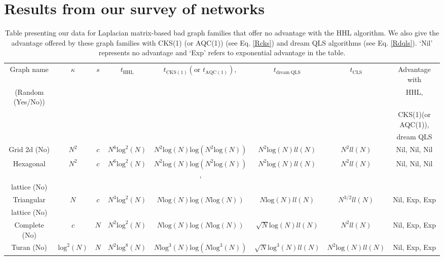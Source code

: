 \documentclass[%
 reprint,
 superscriptaddress,
 amsmath,amssymb,
 aps,
 pra,
floatfix,
nofootinbib,
]{revtex4-2}
\theoremstyle{definition}
\theoremstyle{remark}
\begin{document}
\section{Results from our survey of networks} \label{sec:survey} 

\newcommand{\columnn}[8]{#1 &#2 &#3 &#4 &#6  &#8 &#5 &#7  \\ }
\begin{table}[t] 
\caption{Table presenting our data for Laplacian matrix-based bad graph families that offer no advantage with the HHL algorithm. We also give the advantage offered by these graph families with CKS(1) (or AQC(1)) (see Eq. \ref{Rcks}) and dream QLS algorithms (see Eq. \ref{Rdqls}). `Nil' represents no advantage and `Exp' refers to exponential advantage in the table. } 
\label{tab:yaya2} 
\centering 
\hspace*{-1.3cm}
\begin{tabular}{|c|c|c|c|c|c|c|c|}

\hline 
\columnn{Graph name}{$\kappa$}{$s$}{$t_{\mathrm{HHL}}$}{$t_{\mathrm{CLS}}$}{$t_{\mathrm{CKS(1)}}(\text{or }t_{\mathrm{AQC(1)}}), $}{Advantage with} {$t_{\mathrm{dream\ QLS}}$}
\columnn{(Random (Yes/No))}{}{}{}{}{}{HHL, }{}
\columnn{}{}{}{}{}{}{CKS(1)(or AQC(1)),}{}
\columnn{}{}{}{}{}{}{dream QLS}{}

\hline 
\hline 

\columnn{Grid 2d (No)}{$N^2$}{$c$} {$N^6 \mathrm{log}^{2}(N)$}{$N^2ll(N)$}{$N^2\mathrm{log}(N)\mathrm{log}(N^2\mathrm{log}(N))$}{Nil, Nil, Nil}{$N^2\mathrm{log}(N)ll(N)$}
\hline 

\columnn{Hexagonal }{$N^2$}{$c$} {$N^6 \mathrm{log}^{2}(N)$}{$N^2ll(N)$}{$N^2\mathrm{log}(N)\mathrm{log}(N^2\mathrm{log}(N))$,}{Nil, Nil, Nil}{$N^2\mathrm{log}(N)ll(N)$}
\columnn{lattice (No)}{}{}{}{}{}{}{}
\hline 

\columnn{Triangular}{$N$}{$c$} {$N^3 \mathrm{log}^{2}(N)$}{$N^{3/2}ll(N)$}{$N\mathrm{log}(N)\mathrm{log}(N\mathrm{log}(N))$}{Nil, Exp, Exp}{$N\mathrm{log}(N)ll(N)$}
\columnn{lattice (No)}{}{}{}{}{}{}{}
\hline 

\columnn{Complete (No)}{$c$}{$N$} {$N^2 \mathrm{log}^{2}(N)$}{$N^{2}ll(N)$}{$N\mathrm{log}(N)\mathrm{log}(N\mathrm{log}(N))$}{Nil, Exp, Exp}{$\sqrt{N}\mathrm{log}(N)ll(N)$}
\hline 

\columnn{Turan (No)}{$\mathrm{log}^2(N)$}{$N$} {$N^2 \mathrm{log}^{8}(N)$}{$N^{2}\mathrm{log}(N)ll(N)$}{$N\mathrm{log}^3(N)\mathrm{log}(N\mathrm{log}^3(N))$}{Nil, Exp, Exp }{$\sqrt{N}\mathrm{log}^3(N)ll(N)$}
\hline 


\end{tabular}
\end{table}
\end{document}
